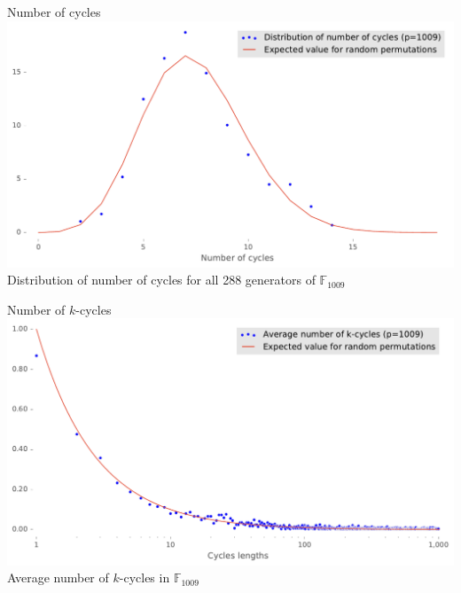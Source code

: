 
\begin{frame}{Number of cycles}
        \centering
        \includegraphics[width=\textwidth]{figures/distribution_of_number_of_cycles_p_1009}\\
 {Distribution of number of cycles for all 288 generators of $\mathbb{F}_{1009}$}
\end{frame}

\begin{frame}{Number of $k$-cycles}
        \centering
        \includegraphics[width=\textwidth]{figures/average_number_of_k_cycles_p_1009}\\
{Average number of $k$-cycles in $\mathbb{F}_{1009}$}
\end{frame}

